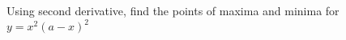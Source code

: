 
%
%
%
%
% 
% 

\question Using second derivative, find the points of maxima and minima for $y=x^2(a-x)^2$

\insertQR{}

\ifprintanswers
\fi 

